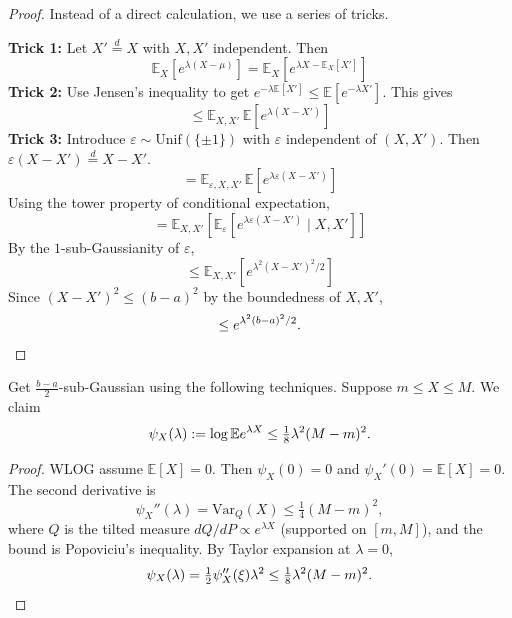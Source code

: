 \begin{proof}
Instead of a direct calculation, we use a series of tricks.

\textbf{Trick 1:} Let $X' \stackrel{d}{=} X$ with $X, X'$ independent. Then
\[
\mathbb{E}_X[e^{\lambda(X-\mu)}] = \mathbb{E}_X[e^{\lambda X - \mathbb{E}_X[X']}]
\]
\textbf{Trick 2:} Use Jensen's inequality to get $e^{-\lambda \mathbb{E}[X']} \leq \mathbb{E}[e^{-\lambda X'}]$. This gives
\[
\leq \mathbb{E}_{X, X'}\, \mathbb{E}[e^{\lambda(X - X')}]
\]
\textbf{Trick 3:} Introduce $\varepsilon \sim \mathrm{Unif}(\{\pm 1\})$ with $\varepsilon$ independent of $(X, X')$. Then $\varepsilon(X - X') \stackrel{d}{=} X - X'$.
\[
= \mathbb{E}_{\varepsilon, X, X'}\, \mathbb{E}[e^{\lambda \varepsilon (X - X')}]
\]
Using the tower property of conditional expectation,
\[
= \mathbb{E}_{X, X'}\!\left[ \mathbb{E}_\varepsilon[e^{\lambda \varepsilon (X - X')} \mid X, X'] \right]
\]
By the $1$-sub-Gaussianity of $\varepsilon$,
\[
\leq \mathbb{E}_{X, X'}[e^{\lambda^2 (X - X')^2 / 2}]
\]
Since $(X - X')^2 \leq (b - a)^2$ by the boundedness of $X, X'$,
\[
\leq e^{\lambda^2 (b - a)^2 / 2}. \qedhere
\]
\end{proof}
\begin{rem}
    Get $\frac{b-a}{2}$-sub-Gaussian using the following techniques.
    Suppose $m \leq X \leq M$. We claim
    \[
    \psi_X(\lambda):= \log \mathbb{E} e^{\lambda X} \leq \tfrac{1}{8} \lambda^2 (M-m)^2.
    \]
    
    \begin{proof}
    WLOG assume $\mathbb{E}[X] = 0$. Then $\psi_X(0) = 0$ and $\psi_X'(0) = \mathbb{E}[X] = 0$. The second derivative is
    \[
    \psi_X''(\lambda) = \mathrm{Var}_Q(X) \leq \tfrac{1}{4}(M-m)^2,
    \]
    where $Q$ is the tilted measure $dQ/dP \propto e^{\lambda X}$ (supported on $[m,M]$), and the bound is Popoviciu's inequality. By Taylor expansion at $\lambda = 0$,
    \[
    \psi_X(\lambda) = \tfrac{1}{2} \psi_X''(\xi) \lambda^2 \leq \tfrac{1}{8} \lambda^2 (M-m)^2. \qedhere
    \]
    \end{proof}
\end{rem}

